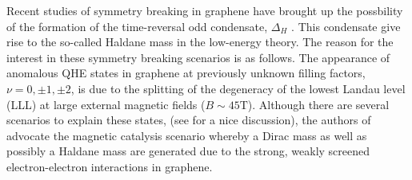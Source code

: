 \documentclass[aps,prd,twocolumn,showpacs,superscriptaddress,groupedaddress]{revtex4}  %
\begin{document}
Recent studies of symmetry breaking in graphene have brought up the possbility of the formation of the time-reversal odd condensate, $\Delta_H$ \cite{MiranskyGraphene2,MiranskyGraphene3}. This condensate give rise to the so-called Haldane mass in the low-energy theory.
The reason for the interest in these symmetry breaking scenarios is as follows.
The appearance of anomalous QHE states in graphene at previously unknown filling factors, $\nu = 0, \pm 1, \pm 2$, is due to the splitting of the degeneracy of the lowest Landau level (LLL) at large external magnetic fields ($B \sim 45 \text{T}$).
Although there are several scenarios to explain these states, (see \cite{Yang} for a nice discussion), the authors of \cite{MiranskyGraphene2, MiranskyGraphene3} advocate the magnetic catalysis scenario whereby a Dirac mass as well as possibly a Haldane mass are generated due to the strong, weakly screened
electron-electron interactions in graphene.

\end{document}
